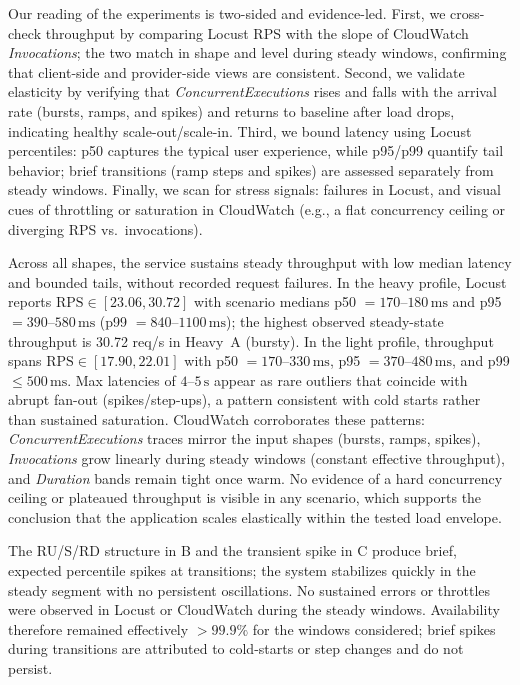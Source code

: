 \documentclass[11pt,a4paper]{article}
\begin{document}
Our reading of the experiments is two-sided and evidence-led. First, we cross-check throughput by comparing Locust RPS with the slope of CloudWatch \emph{Invocations}; the two match in shape and level during steady windows, confirming that client-side and provider-side views are consistent. Second, we validate elasticity by verifying that \emph{ConcurrentExecutions} rises and falls with the arrival rate (bursts, ramps, and spikes) and returns to baseline after load drops, indicating healthy scale-out/scale-in. Third, we bound latency using Locust percentiles: p50 captures the typical user experience, while p95/p99 quantify tail behavior; brief transitions (ramp steps and spikes) are assessed separately from steady windows. Finally, we scan for stress signals: failures in Locust, and visual cues of throttling or saturation in CloudWatch (e.g., a flat concurrency ceiling or diverging RPS vs.\ invocations).

Across all shapes, the service sustains steady throughput with low median latency and bounded tails, without recorded request failures. In the heavy profile, Locust reports \(\text{RPS} \in [23.06, 30.72]\) with scenario medians p50 \(=170\text{--}180\,\mathrm{ms}\) and p95 \(=390\text{--}580\,\mathrm{ms}\) (p99 \(=840\text{--}1100\,\mathrm{ms}\)); the highest observed steady-state throughput is 30.72 req/s in Heavy~A (bursty). In the light profile, throughput spans \(\text{RPS} \in [17.90, 22.01]\) with p50 \(=170\text{--}330\,\mathrm{ms}\), p95 \(=370\text{--}480\,\mathrm{ms}\), and p99 \(\le 500\,\mathrm{ms}\). Max latencies of \(4\text{--}5\,\mathrm{s}\) appear as rare outliers that coincide with abrupt fan-out (spikes/step-ups), a pattern consistent with cold starts rather than sustained saturation. CloudWatch corroborates these patterns: \emph{ConcurrentExecutions} traces mirror the input shapes (bursts, ramps, spikes), \emph{Invocations} grow linearly during steady windows (constant effective throughput), and \emph{Duration} bands remain tight once warm. No evidence of a hard concurrency ceiling or plateaued throughput is visible in any scenario, which supports the conclusion that the application scales elastically within the tested load envelope.

The RU/S/RD structure in B and the transient spike in C produce brief, expected percentile spikes at transitions; the system stabilizes quickly in the steady segment with no persistent oscillations.
No sustained errors or throttles were observed in Locust or CloudWatch during the steady windows. Availability therefore remained effectively \(> 99.9\%\) for the windows considered; brief spikes during transitions are attributed to cold-starts or step changes and do not persist.
\end{document}

